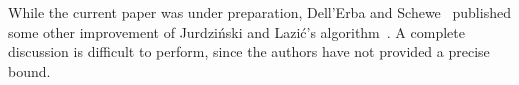 \documentclass[envcountsect,envcountsame]{llncs}
\begin{document}
	\begin{remark}
		While the current paper was under preparation,
		Dell'Erba and Schewe~\cite{Dell_Erba_2022} published some other improvement of Jurdziński and Lazić's algorithm~\cite{progress-measure}.
		A complete discussion is difficult to perform, since the authors have not provided a precise bound.
	\end{remark}



\end{document}
